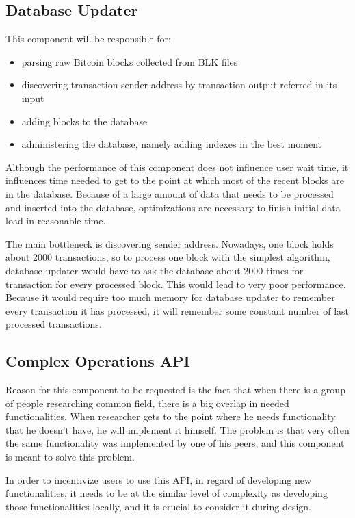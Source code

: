 \documentclass[12pt, en, eng, oneside, final]{mgr}
\begin{document}
\subsection{Database Updater}
This component will be responsible for:

\begin{itemize}
\item
parsing raw Bitcoin blocks collected from BLK files
\item
discovering transaction sender address by transaction output referred in its input
\item
adding blocks to the database
\item
administering the database, namely adding indexes in the best moment
\end{itemize}

Although the performance of this component does not influence user wait time, it influences time needed to get to the point at which most of the recent blocks are in the database. Because of a large amount of data that needs to be processed and inserted into the database, optimizations are necessary to finish initial data load in reasonable time.

The main bottleneck is discovering sender address. Nowadays, one block holds about 2000 transactions, so to process one block with the simplest algorithm, database updater would have to ask the database about 2000 times for transaction for every processed block. This would lead to very poor performance. Because it would require too much memory for database updater to remember every transaction it has processed, it will remember some constant number of last processed transactions.

\subsection{Complex Operations API}
Reason for this component to be requested is the fact that when there is a group of people researching common field, there is a big overlap in needed functionalities. When researcher gets to the point where he needs functionality that he doesn't have, he will implement it himself. The problem is that very often the same functionality was implemented by one of his peers, and this component is meant to solve this problem. 

In order to incentivize users to use this API, in regard of developing new functionalities, it needs to be at the similar level of complexity as developing those functionalities locally, and it is crucial to consider it during design.
\end{document}
